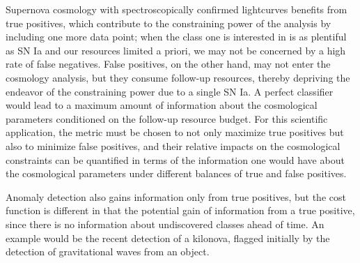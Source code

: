 Supernova cosmology with spectroscopically confirmed lightcurves benefits from true positives, which contribute to the constraining power of the analysis by including one more data point; when the class one is interested in is as plentiful as SN Ia and our resources limited a priori, we may not be concerned by a high rate of false negatives.
False positives, on the other hand, may not enter the cosmology analysis, but they consume follow-up resources, thereby depriving the endeavor of the constraining power due to a single SN Ia.
A perfect classifier would lead to a maximum amount of information about the cosmological parameters conditioned on the follow-up resource budget.
For this scientific application, the metric must be chosen to not only maximize true positives but also to minimize false positives, and their relative impacts on the cosmological constraints can be quantified in terms of the information one would have about the cosmological parameters under different balances of true and false positives.

Anomaly detection also gains information only from true positives, but the cost function is different in that the potential gain of information from a true positive, since there is no information about undiscovered classes ahead of time. An example would be the recent detection of a kilonova, flagged initially by the detection of gravitational waves from an object.

